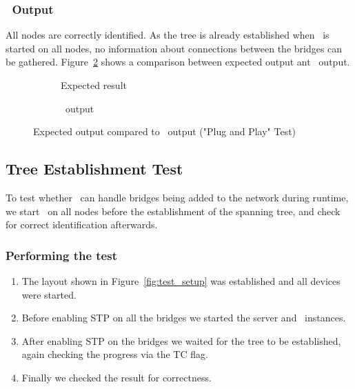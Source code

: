 \subsubsection*{\tool\ Output}
All nodes are correctly identified.
As the tree is already established when \tool\ is started on all nodes, no information about connections between the bridges can be gathered.
Figure~\ref{fig:pnp} shows a comparison between expected output ant \tool\ output.
\begin{figure}[h]
    \begin{subfigure}[b]{\textwidth}
        \centering
        \caption{Expected result}
        \label{fig:pnpExp}
    \end{subfigure}
    
    \vspace{0.5cm}

    \begin{subfigure}[b]{\textwidth}
        \centering
        
        \caption{\tool\ output}
    \end{subfigure}
    \caption{Expected output compared to \tool\ output ("Plug and Play" Test)}
    \label{fig:pnp}
\end{figure}

\subsection*{Tree Establishment Test}
\label{tree_est_test}
To test whether \tool\ can handle bridges being added to the network during runtime, we start \tool\ on all nodes before the establishment of the spanning tree, and check for correct identification afterwards.

\subsubsection*{Performing the test}
\begin{enumerate}
    \item The layout shown in Figure~\ref{fig:test_setup} was established and all devices were started.
    \item Before enabling STP on all the bridges we started the server and \tool\ instances.
    \item After enabling STP on the bridges we waited for the tree to be established, again checking the progress via the TC flag.
    \item Finally we checked the result for correctness.
\end{enumerate}


